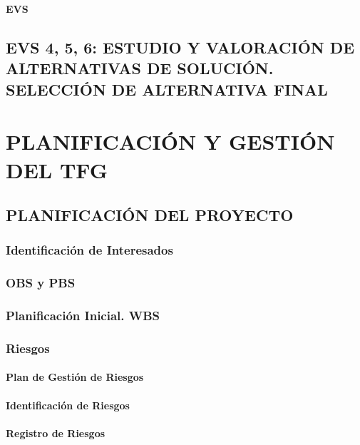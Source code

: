 \documentclass[11pt]{report}
\begin{document}
	\begin{center}
	\Huge \textbf{EVS}\par
	\end{center}

\newpage


\section{EVS 4, 5, 6: ESTUDIO Y VALORACIÓN DE ALTERNATIVAS DE SOLUCIÓN. SELECCIÓN DE ALTERNATIVA FINAL}




\newpage
\chapter{PLANIFICACIÓN Y GESTIÓN DEL TFG}
\newpage

\newpage
\section{PLANIFICACIÓN DEL PROYECTO}

\subsection{Identificación de Interesados}


\subsection{OBS y PBS}


\subsection{Planificación Inicial. WBS}


\subsection{Riesgos}

\subsubsection{Plan de Gestión de Riesgos} 

\subsubsection{Identificación de Riesgos}

\subsubsection{Registro de Riesgos} 
\end{document}
